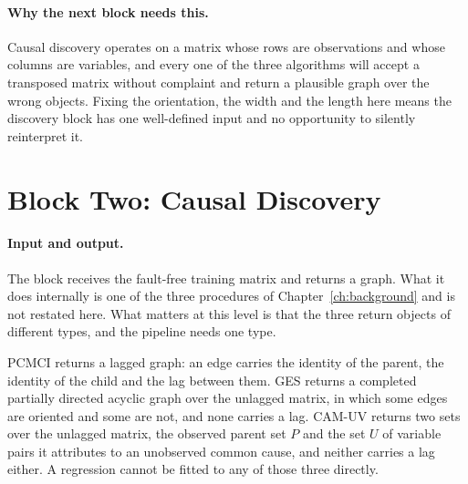 \paragraph{Why the next block needs this.} Causal discovery operates on a matrix whose rows are observations and whose columns are variables, and every one of the three algorithms will accept a transposed matrix without complaint and return a plausible graph over the wrong objects. Fixing the orientation, the width and the length here means the discovery block has one well-defined input and no opportunity to silently reinterpret it.

\section{Block Two: Causal Discovery}
\label{sec:method-axis1}

\paragraph{Input and output.} The block receives the fault-free training matrix and returns a graph. What it does internally is one of the three procedures of Chapter~\ref{ch:background} and is not restated here. What matters at this level is that the three return objects of different types, and the pipeline needs one type.

PCMCI returns a lagged graph: an edge carries the identity of the parent, the identity of the child and the lag between them. GES returns a completed partially directed acyclic graph over the unlagged matrix, in which some edges are oriented and some are not, and none carries a lag. CAM-UV returns two sets over the unlagged matrix, the observed parent set $P$ and the set $U$ of variable pairs it attributes to an unobserved common cause, and neither carries a lag either. A regression cannot be fitted to any of those three directly.

